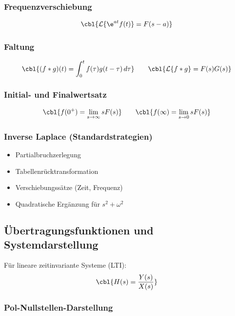 \subsubsection{Frequenzverschiebung}

\[
\cbl{\mathcal{L}\{\e^{at} f(t)\} = F(s-a)}
\]

\subsubsection{Faltung}

\[
\cbl{(f*g)(t) = \int_0^t f(\tau)g(t-\tau)\,d\tau}
\qquad
\cbl{\mathcal{L}\{f*g\} = F(s)G(s)}
\]

\subsubsection{Initial- und Finalwertsatz}

\[
\cbl{f(0^+) = \lim_{s\to\infty} sF(s)}
\qquad
\cbl{f(\infty) = \lim_{s\to 0} sF(s)}
\]


\subsubsection{Inverse Laplace (Standardstrategien)}

\begin{itemize}
    \item Partialbruchzerlegung
    \item Tabellenrücktransformation
    \item Verschiebungssätze (Zeit, Frequenz)
    \item Quadratische Ergänzung für $s^2+\omega^2$
\end{itemize}

\subsection{Übertragungsfunktionen und Systemdarstellung}

Für lineare zeitinvariante Systeme (LTI):
\[
\cbl{H(s) = \frac{Y(s)}{X(s)}}
\]

\subsubsection{Pol-Nullstellen-Darstellung}

